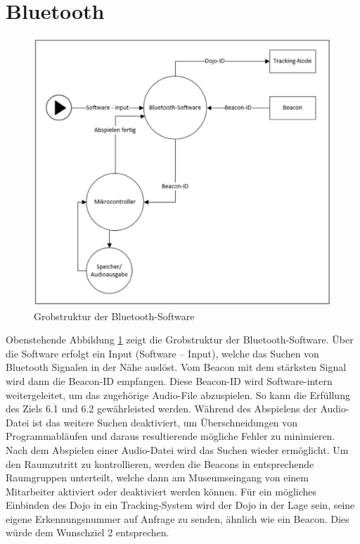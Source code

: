 \section{Bluetooth}

\begin{figure}[H]
\begin{center}
	\includegraphics[width=120mm]{data/Bluetooth.png}
	\caption{Grobstruktur der Bluetooth-Software} %
	\label{fig:Grobstruktur_Bluetooth}
\end{center}
\end{figure}

Obenstehende Abbildung \ref*{fig:Grobstruktur_Bluetooth} zeigt die Grobstruktur der Bluetooth-Software. Über die Software erfolgt ein Input (Software – Input), welche das Suchen von Bluetooth Signalen in der Nähe auslöst. Vom Beacon mit dem stärksten Signal wird dann die Beacon-ID empfangen. Diese Beacon-ID wird Software-intern weitergeleitet, um das zugehörige Audio-File abzuspielen. So kann die Erfüllung des Ziels 6.1 und 6.2 gewährleisted werden. Während des Abspielens der Audio-Datei ist das weitere Suchen deaktiviert, um Überschneidungen von Programmabläufen und daraus resultierende mögliche Fehler zu minimieren. Nach dem Abspielen einer Audio-Datei wird das Suchen wieder ermöglicht. Um den Raumzutritt zu kontrollieren, werden die Beacons in entsprechende Raumgruppen unterteilt, welche dann am Museumseingang von einem Mitarbeiter aktiviert oder deaktiviert werden können. Für ein mögliches Einbinden des Dojo in ein Tracking-System wird der Dojo in der Lage sein, seine eigene Erkennungsnummer auf Anfrage zu senden, ähnlich wie ein Beacon. Dies würde dem Wunschziel 2 entsprechen.
